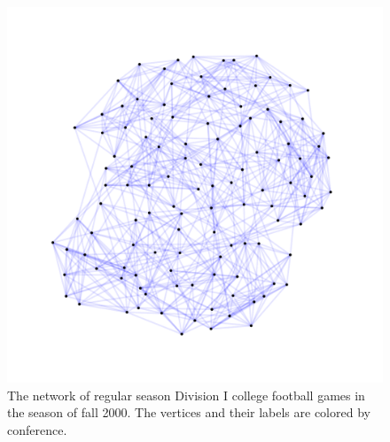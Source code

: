 \documentclass[11pt]{article}\usepackage[]{graphicx}\usepackage[]{color}
\begin{document}
\begin{figure}
\centering
\includegraphics[width=\textwidth]{figure/football_ex-1.pdf}
\caption{\label{fig.cap:football_ex} The network of regular season Division I college football games in the season of fall 2000. The vertices and their labels are colored by conference.}
\end{figure}
\afterpage{\clearpage}
\end{document}
